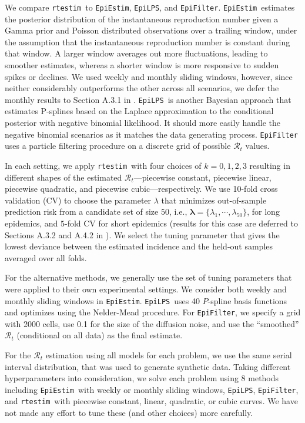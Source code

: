 \documentclass[10pt,letterpaper]{article}
\def\RtEstim{\texttt{rtestim}}
\def\EpiEstim{\texttt{EpiEstim}}
\def\EpiLPS{\texttt{EpiLPS}}
\def\EpiFilter{\texttt{EpiFilter}}
\def\calR{\mathcal{R}}
\begin{document}
We compare \RtEstim\ to \EpiEstim, \EpiLPS, and \EpiFilter. \EpiEstim\ estimates
the posterior distribution of the instantaneous reproduction number given a
Gamma prior and Poisson distributed observations over a trailing window, under
the assumption that the instantaneous reproduction number is constant during
that window. A larger window averages out more fluctuations, leading to smoother
estimates, whereas a shorter window is more responsive to sudden spikes or
declines. We used weekly and monthly sliding windows, however, since neither
considerably outperforms the other across all scenarios, we defer the monthly
results to Section A.3.1 in . \EpiLPS\ is another Bayesian approach
that estimates P-splines based on the Laplace approximation to the conditional
posterior with negative binomial likelihood. It should more easily handle the
negative binomial scenarios as it matches the data generating process.
\texttt{EpiFilter} uses a particle filtering procedure on a discrete grid of
possible $\calR_t$ values.

In each setting, we apply \RtEstim\ with four choices of $k=0,1, 2, 3$ resulting
in different shapes of the estimated $\calR_t$---piecewise constant, piecewise
linear, piecewise quadratic, and piecewise cubic---respectively. We use 10-fold
cross validation (CV) to choose the parameter $\lambda$ that minimizes
out-of-sample prediction risk from a candidate set of size $50$, i.e.,
$\boldsymbol{\lambda} = \{\lambda_1, \cdots, \lambda_{50}\}$, for long
epidemics, and $5$-fold CV for short epidemics (results for this case are
deferred to Sections A.3.2 and A.4.2 in ). We select the tuning
parameter that gives the lowest deviance between the estimated
incidence and the held-out samples averaged over all folds. 

For the alternative methods, we generally use the set of tuning parameters that
were applied to their own experimental settings. We consider both weekly and
monthly sliding windows in \EpiEstim. \EpiLPS\ uses 40 $P$-spline basis
functions and optimizes using the Nelder-Mead procedure. For \EpiFilter, we
specify a grid with 2000 cells, use 0.1 for the size of the diffusion noise, and
use the ``smoothed'' $\calR_t$ (conditional on all data) as the final estimate. 

For the $\calR_t$ estimation using all models for each problem, we use the same
serial interval distribution, that was used to generate synthetic data. Taking
different hyperparameters into consideration, we solve each problem using 8
methods including \EpiEstim\ with weekly or monthly sliding windows, \EpiLPS,
\EpiFilter, and \RtEstim\ with piecewise constant, linear, quadratic, or cubic
curves. We have not made any effort to tune these (and other choices) more
carefully.
\end{document}
